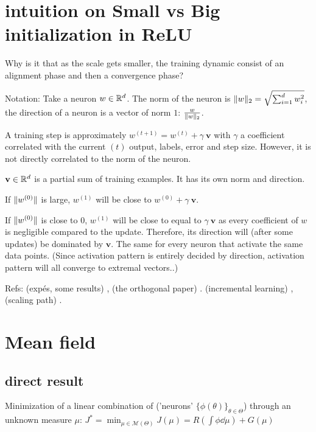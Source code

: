 \section{intuition on Small vs Big initialization in ReLU}

Why is it that as the scale gets smaller, the training dynamic consist of an alignment phase and then a convergence phase?

Notation: Take a neuron $w \in \mathbb{R}^d$. The norm of the neuron is $\lVert w\rVert_2 = \sqrt{\sum_{i=1}^{d} w_i^2}$, the direction of a neuron is a vector of norm $1$: $\frac{w}{\lVert w\rVert_2}$.

A training step is approximately $w^{(t+1)} = w^{(t)} + \gamma ~ \mathbf{v}$ with $\gamma$ a coefficient correlated with the current $(t)$ output, labels, error and step size. However, it is not directly correlated to the norm of the neuron.

$\mathbf{v} \in \mathbb{R}^d$ is a partial sum of training examples. It has its own norm and direction.

If $\lVert w^{(0)}\rVert$ is large, $w^{(1)}$ will be close to $w^{(0)} + \gamma ~ \mathbf{v}$.

If $\lVert w^{(0)}\rVert$ is close to 0, $w^{(1)}$ will be close to equal to $\gamma ~ \mathbf{v}$ as every coefficient of $w$ is negligible compared to the update. Therefore, its direction will (after some updates) be dominated by $\mathbf{v}$. The same for every neuron that activate the same data points. (Since activation pattern is entirely decided by direction, activation pattern will all converge to extremal vectors..)

Refs: (expés, some results) \citep{maennel2018gradient}, (the orthogonal paper) \citep{boursierGradientFlowDynamics2022}. (incremental learning) \citep{berthierIncrementalLearningDiagonal}, (scaling path) \citep{neumayerEffectInitializationScaling2023}.

\section{Mean field}



\subsection{direct result}

Minimization of a linear combination of ('neurons' $\{\phi(\theta)\}_{\theta \in \Theta}$) through an unknown measure $\mu$: $J^* = \min_{\mu \in \mathcal{M}(\Theta)} J(\mu) = R(\int \phi \dd \mu) + G(\mu)$

